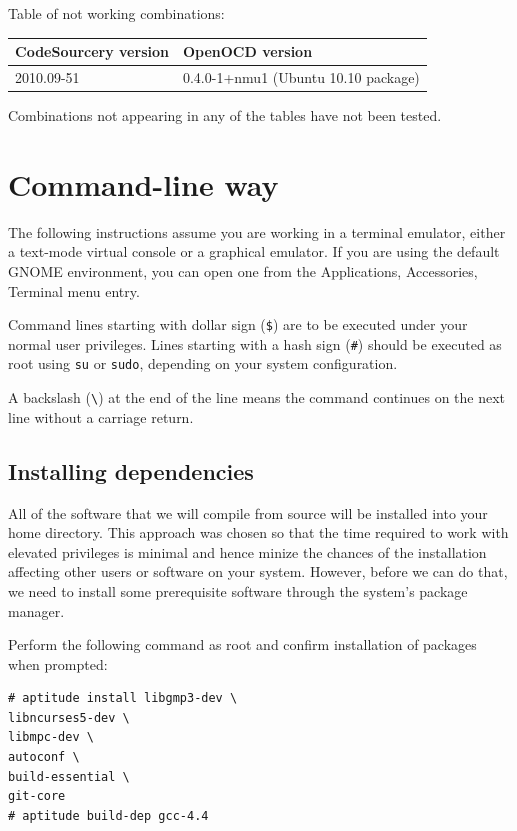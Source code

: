 \documentclass[a4paper, 10pt]{article}
\begin{document}
Table of not working combinations:

    \smallskip
    \begin{tabular}{ l | l }
    CodeSourcery version & OpenOCD version \\
    \hline
    2010.09-51          &   0.4.0-1+nmu1 (Ubuntu 10.10 package) \\
    \end{tabular}
    \smallskip

Combinations not appearing in any of the tables have not been tested.


\newpage

\section{Command-line way}

The following instructions assume you are working in a terminal emulator,
either a text-mode virtual console or a graphical emulator. If you are using the
default GNOME environment, you can open one from the Applications, Accessories,
Terminal menu entry.

Command lines starting with dollar sign (\verb|$|) are to be executed under your
normal user privileges. Lines starting with a hash sign (\verb|#|) should be
executed as root using \verb|su| or \verb|sudo|, depending on your system
configuration.

A backslash (\verb|\|) at the end of the line means the command continues on the
next line without a carriage return.

\subsection{Installing dependencies}

All of the software that we will compile from source will be installed into
your home directory. This approach was chosen so that the time required to
work with elevated privileges is minimal and hence minize the chances of the
installation affecting other users or software on your system. However, before
we can do that, we need to install some prerequisite software through the
system's package manager.

Perform the following command as root and confirm installation of packages
when prompted:

\begin{verbatim}
# aptitude install libgmp3-dev \
libncurses5-dev \
libmpc-dev \
autoconf \
build-essential \
git-core
# aptitude build-dep gcc-4.4
\end{verbatim}
\end{document}
